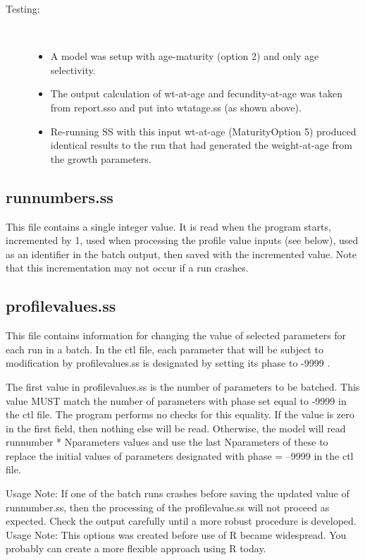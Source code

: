 \begin{description}
	\item[Testing:]\hfill\\
		\begin{itemize}
			\item A model was setup with age-maturity (option 2) and only age selectivity.
			\item The output calculation of wt-at-age and fecundity-at-age was taken from report.sso and put into wtatage.ss (as shown above).
			\item Re-running SS with this input wt-at-age (Maturity\textunderscore Option 5) produced identical results to the run that had generated the weight-at-age from the growth parameters.
		\end{itemize}
\end{description}


\subsection{runnumbers.ss}
This file contains a single integer value.  It is read when the program starts, incremented by 1, used when processing the profile value inputs (see below), used as an identifier in the batch output, then saved with the incremented value.  Note that this incrementation may not occur if a run crashes.

\subsection{profilevalues.ss}	
This file contains information for changing the value of selected parameters for each run in a batch.  In the ctl file, each parameter that will be subject to modification by profilevalues.ss is designated by setting its phase to -9999 .

The first value in profilevalues.ss is the number of parameters to be batched.  This value MUST match the number of parameters with phase set equal to -9999 in the ctl file.  The program performs no checks for this equality.  If the value is zero in the first field, then nothing else will be read.  Otherwise, the model will read runnumber * Nparameters values and use the last Nparameters of these to replace the initial values of parameters designated with phase = --9999 in the ctl file.

Usage Note:  If one of the batch runs crashes before saving the updated value of runnumber.ss, then the processing of the profilevalue.ss will not proceed as expected.  Check the output carefully until a more robust procedure is developed.
  Usage Note:  This options was created before use of R became widespread.  You probably can create a more flexible approach using R today.



